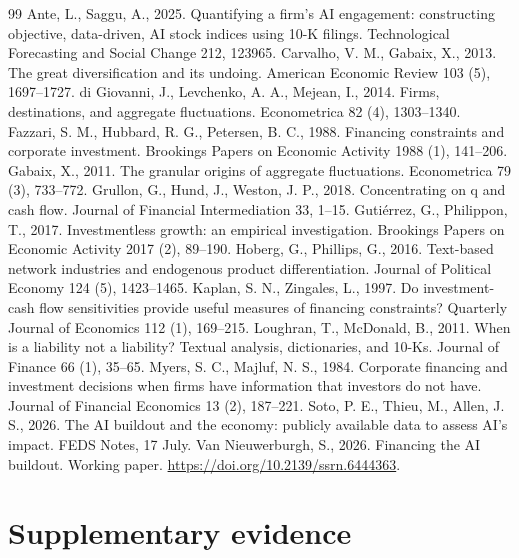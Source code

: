 \documentclass[preprint,11pt]{elsarticle}
\begin{document}
\begin{thebibliography}{99}
 Ante, L., Saggu, A., 2025. Quantifying a firm's AI engagement: constructing objective, data-driven, AI stock indices using 10-K filings. Technological Forecasting and Social Change 212, 123965.
 Carvalho, V. M., Gabaix, X., 2013. The great diversification and its undoing. American Economic Review 103 (5), 1697--1727.
 di Giovanni, J., Levchenko, A. A., Mejean, I., 2014. Firms, destinations, and aggregate fluctuations. Econometrica 82 (4), 1303--1340.
 Fazzari, S. M., Hubbard, R. G., Petersen, B. C., 1988. Financing constraints and corporate investment. Brookings Papers on Economic Activity 1988 (1), 141--206.
 Gabaix, X., 2011. The granular origins of aggregate fluctuations. Econometrica 79 (3), 733--772.
 Grullon, G., Hund, J., Weston, J. P., 2018. Concentrating on q and cash flow. Journal of Financial Intermediation 33, 1--15.
 Guti\'errez, G., Philippon, T., 2017. Investmentless growth: an empirical investigation. Brookings Papers on Economic Activity 2017 (2), 89--190.
 Hoberg, G., Phillips, G., 2016. Text-based network industries and endogenous product differentiation. Journal of Political Economy 124 (5), 1423--1465.
 Kaplan, S. N., Zingales, L., 1997. Do investment-cash flow sensitivities provide useful measures of financing constraints? Quarterly Journal of Economics 112 (1), 169--215.
 Loughran, T., McDonald, B., 2011. When is a liability not a liability? Textual analysis, dictionaries, and 10-Ks. Journal of Finance 66 (1), 35--65.
 Myers, S. C., Majluf, N. S., 1984. Corporate financing and investment decisions when firms have information that investors do not have. Journal of Financial Economics 13 (2), 187--221.
 Soto, P. E., Thieu, M., Allen, J. S., 2026. The AI buildout and the economy: publicly available data to assess AI's impact. FEDS Notes, 17 July.
 Van Nieuwerburgh, S., 2026. Financing the AI buildout. Working paper. \url{https://doi.org/10.2139/ssrn.6444363}.
\end{thebibliography}

\clearpage
\appendix
\setcounter{section}{0}
\renewcommand{\thesection}{Appendix~\Alph{section}}
\renewcommand{\thetable}{\Alph{section}\arabic{table}}\setcounter{table}{0}

\section{Supplementary evidence}\label{app:supp}
\end{document}
